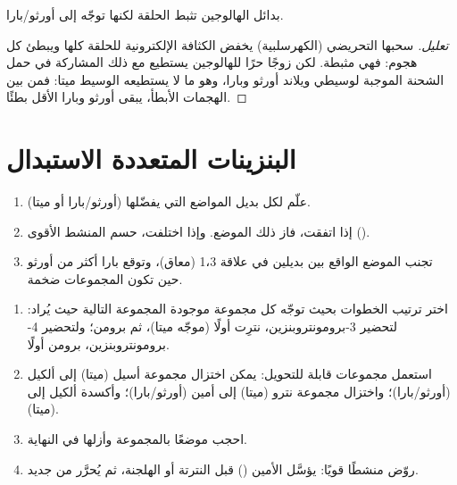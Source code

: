 \begin{proposition}[الهالوجينات]\label{prop:b2:aromatic-substitution:halogens}
بدائل الهالوجين تثبط الحلقة لكنها توجّه إلى أورثو/بارا.
\end{proposition}

\begin{proof}[تعليل]
سحبها التحريضي (الكهرسلبية) يخفض الكثافة الإلكترونية للحلقة كلها
ويبطئ كل هجوم: فهي مثبطة. لكن زوجًا حرًا للهالوجين يستطيع مع ذلك المشاركة في حمل
الشحنة الموجبة لوسيطي ويلاند أورثو وبارا، وهو ما لا يستطيعه الوسيط ميتا:
فمن بين الهجمات الأبطأ، يبقى أورثو وبارا الأقل بطئًا.
\end{proof}

\section{البنزينات المتعددة الاستبدال}

\begin{method}\label{met:b2:aromatic-substitution:predict-position}
\begin{enumerate}
  \item علّم لكل بديل المواضع التي يفضّلها (أورثو/بارا أو ميتا).
  \item إذا اتفقت، فاز ذلك الموضع. وإذا اختلفت، حسم المنشط الأقوى
        ().
  \item تجنب الموضع الواقع بين بديلين في علاقة 1،3 (معاق)، 
        وتوقع بارا أكثر من أورثو حين تكون المجموعات ضخمة.
\end{enumerate}
\end{method}

\begin{method}\label{met:b2:aromatic-substitution:plan-aromatic}
\begin{enumerate}
  \item اختر ترتيب الخطوات بحيث توجّه كل مجموعة موجودة المجموعة التالية
        حيث يُراد: لتحضير 3-برومونتروبنزين، نترِت أولًا (موجّه ميتا)، ثم
        برومن؛ ولتحضير 4-برومونتروبنزين، برومن أولًا.
  \item استعمل مجموعات قابلة للتحويل: يمكن اختزال مجموعة أسيل (ميتا) إلى ألكيل (أورثو/بارا)؛
        واختزال مجموعة نترو (ميتا) إلى أمين (أورثو/بارا)؛ وأكسدة ألكيل إلى
         (ميتا).
  \item احجب موضعًا بالمجموعة  وأزلها في النهاية.
  \item روّض منشطًا قويًا: يؤسَّل الأمين () قبل النترتة أو
        الهلجنة، ثم يُحرَّر من جديد.
\end{enumerate}
\end{method}

